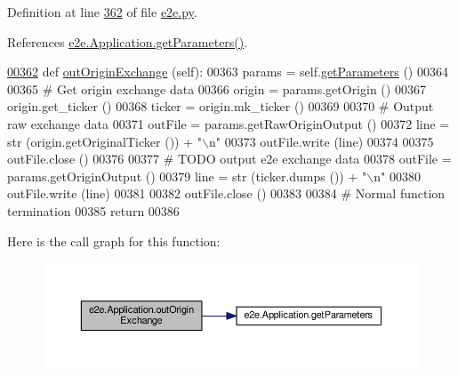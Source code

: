 Definition at line \hyperlink{e2e_8py_source_l00362}{362} of file \hyperlink{e2e_8py_source}{e2e.\+py}.



References \hyperlink{e2e_8py_source_l00340}{e2e.\+Application.\+get\+Parameters()}.


\begin{DoxyCode}
\hypertarget{classe2e_1_1_application.tex_l00362}{}\hyperlink{classe2e_1_1_application_adfad90d64cddb8d751961202264ca489}{00362}     \textcolor{keyword}{def }\hyperlink{classe2e_1_1_application_adfad90d64cddb8d751961202264ca489}{outOriginExchange} (self):
00363         params = self.\hyperlink{classe2e_1_1_application_ae7bc7b58f19d681635cfa8ae06d9769b}{getParameters} ()
00364         
00365         \textcolor{comment}{# Get origin exchange data}
00366         origin = params.getOrigin ()
00367         origin.get\_ticker ()
00368         ticker = origin.mk\_ticker ()
00369 
00370         \textcolor{comment}{# Output raw exchange data}
00371         outFile = params.getRawOriginOutput ()
00372         line = str (origin.getOriginalTicker ()) + \textcolor{stringliteral}{"\(\backslash\)n"}
00373         outFile.write (line)
00374         
00375         outFile.close ()
00376     
00377         \textcolor{comment}{# TODO output e2e exchange data}
00378         outFile = params.getOriginOutput ()
00379         line = str (ticker.dumps ()) + \textcolor{stringliteral}{"\(\backslash\)n"}
00380         outFile.write (line)
00381         
00382         outFile.close ()
00383     
00384         \textcolor{comment}{# Normal function termination }
00385         \textcolor{keywordflow}{return} 
00386     
\end{DoxyCode}


Here is the call graph for this function\+:\nopagebreak
\begin{figure}[H]
\begin{center}
\leavevmode
\includegraphics[width=350pt]{classe2e_1_1_application_adfad90d64cddb8d751961202264ca489_cgraph}
\end{center}
\end{figure}


